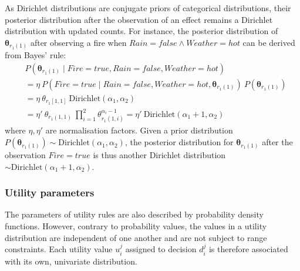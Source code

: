 As Dirichlet distributions are conjugate priors of categorical distributions, their posterior distribution after the observation of an effect remains a Dirichlet distribution with updated counts. For instance, the posterior distribution of $\boldsymbol\theta_{r_{1}(1)}$ after observing a fire when $\mathit{Rain}\!=\!\mathit{false} \land \mathit{Weather}\!=\!\mathit{hot}$ can be derived from Bayes' rule: 
\begin{align}
&P(\boldsymbol\theta_{r_{1}(1)} \; | \; \mathit{Fire}\!=\!\mathit{true}, \mathit{Rain}\!=\!\mathit{false}, \mathit{Weather}\!=\!\mathit{hot}) \nonumber \\
& = \eta \ P(\mathit{Fire}\!=\!\mathit{true} \; | \; \mathit{Rain}\!=\!\mathit{false}, \mathit{Weather}\!=\!\mathit{hot}, \boldsymbol\theta_{r_{1}(1)}) \ P(\boldsymbol\theta_{r_{1}(1)}) \nonumber \\
& = \eta \ \theta_{r_{1}[1,1]} \ \mathrm{Dirichlet}(\alpha_1,\alpha_2) \nonumber \\
& = \eta' \ \theta_{r_{1}(1,1)} \ \prod_{i=1}^2 \theta_{r_{1}(1,i)}^{\alpha_i - 1}   = \eta' \ \textrm{Dirichlet}(\alpha_1+1,\alpha_2) \nonumber
\end{align}
where $\eta, \eta'$ are normalisation factors.  Given a prior distribution $P(\boldsymbol\theta_{r_{1}(1)}) \sim \mathrm{Dirichlet}(\alpha_1, \alpha_2)$, the posterior distribution for $\boldsymbol\theta_{r_{1}(1)}$ after the observation  $\mathit{Fire}\!=\!\mathit{true}$ is thus another Dirichlet distribution $\sim \mathrm{Dirichlet}(\alpha_1+1,\alpha_2)$. 



\subsubsection*{Utility parameters}

The parameters of utility rules are also described by probability density functions.  However, contrary to probability values, the values in a utility distribution are independent of one another and are not subject to range constraints. Each utility value $u_i^j$ assigned to decision $d_i^j$ is therefore associated with its own, univariate distribution.

